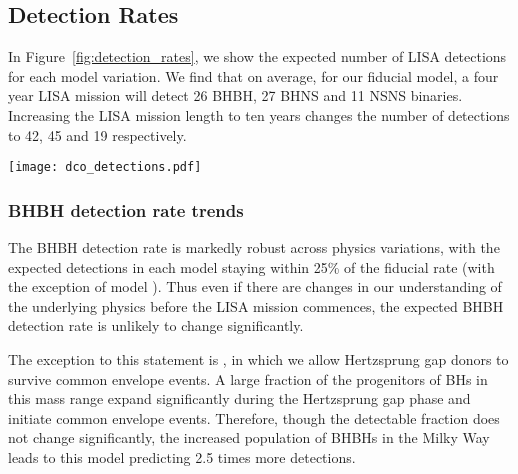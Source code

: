 \subsection{Detection Rates}
In Figure~\ref{fig:detection_rates}, we show the expected number of LISA detections for each model variation. We find that on average, for our fiducial model, a four year LISA mission will detect 26 BHBH, 27 BHNS and 11 NSNS binaries. Increasing the LISA mission length to ten years changes the number of detections to 42, 45 and 19 respectively.

\begin{figure*}[p]
    \centering
    \texttt{[image: dco\_detections.pdf]}
    \caption{The number of expected detections in the LISA mission for different DCO types and model variations. Error bars show the 1 (solid) and 2 (dotted) $\sigma$ uncertainties. The left axis and grid lines show the number of detections in a four year LISA mission and the right axis shows an approximation of the number of detections in a 10 year mission (we scale the axis by $\sqrt{T_{\rm obs}}$, see Table~\ref{tab:detection_rates} for exact rates). Each model is described in further detail in Table~\ref{tab:physics_variations} and details of the fiducial assumptions are in  Section~\ref{sec:fiducial_physics}}
    \label{fig:detection_rates}
\end{figure*}

\subsubsection{BHBH detection rate trends}
The BHBH detection rate is markedly robust across physics variations, with the expected detections in each model staying within 25\% of the fiducial rate (with the exception of model \modOpt{}). Thus even if there are changes in our understanding of the underlying physics before the LISA mission commences, the expected BHBH detection rate is unlikely to change significantly.

The exception to this statement is \modOpt{}, in which we allow Hertzsprung gap donors to survive common envelope events. A large fraction of the progenitors of BHs in this mass range expand significantly during the Hertzsprung gap phase and initiate common envelope events. Therefore, though the detectable fraction does not change significantly, the increased population of BHBHs in the Milky Way leads to this model predicting 2.5 times more detections. 

